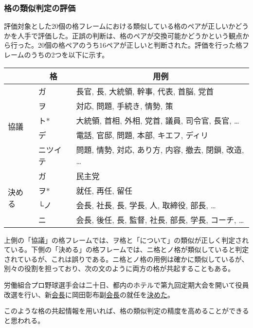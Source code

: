 \documentclass[fleqn]{nlp}
\newcommand{\sm}[1]{}
\begin{document}
\subsubsection{格の類似判定の評価}

評価対象とした20個の格フレームにおける類似している格のペアが正しいかどう
かを人手で評価した。正誤の判断は、格のペアが交換可能かどうかという観点か
ら行った。20個の格ペアのうち16ペアが正しいと判断された。評価を行った格フ
レームのうちの2つを以下に示す。

\vspace*{2ex}

 \begin{tabular}{l|l|l} \hline
                         & \multicolumn{1}{c|}{格} & \multicolumn{1}{c}{用例} \\ \hline
 \multirow{5}{2zw}{協議} & ガ  & 長官, 長, 大統領, 幹事, 代表, 首脳, 党首 \\
                         & ヲ  & 対応, 問題, 手続き, 情勢, 策 \\
                         & ト* & 大統領, 首相, 外相, 党首, 議員, 司令官, 長官, … \\
                         & デ  & 電話, 官邸, 問題, 本部, キエフ, ディリ \\
                         & ニツイテ & 問題, 情勢, 対応, あり方, 内容, 撤去, 閉鎖, 改造, … \\ \hline
 \multirow{4}{3zw}{決める} & ガ  & 民主党 \\
                           & ヲ* & 就任, 再任, 留任 \\
                           & └ノ& 会長, 社長, 長, 学長, \sm{数量}人, 取締役, 部長, … \\
                           & ニ  & 会長, 後任, 長, 監督, 社長, 部長, 学長, コーチ, … \\ \hline
 \end{tabular}

\vspace*{3ex}

上側の「協議」の格フレームでは、ヲ格と「について」の類似が正しく判定され
ている。下側の「決める」の格フレームでは、ニ格とノ格が類似していると判定
されているが、これは誤りである。ニ格とノ格の用例は確かに類似しているが、
別々の役割を担っており、次の文のように両方の格が共起することもある。
\begin{exe}
 \ex 労働組合プロ野球選手会は二十日、都内のホテルで第九回定期大会を開いて役員改選を行い、新\underline{会長}に岡田彰布副\underline{会長}の就任を\underline{\underline{決めた}}。
\end{exe}
このような格の共起情報を用いれば、格の類似判定の精度を高めることができる
と思われる。
\end{document}
